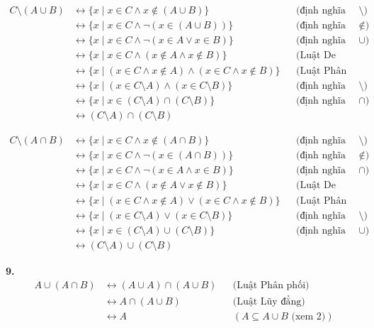 \documentclass[12pt,a4paper]{article}
\theoremstyle{definition}
\begin{document}
\begin{align*}
C \setminus (A \cup B) &\leftrightarrow \{x \mid x \in C \land x \notin (A \cup B)\} && \text{(định nghĩa của $\setminus$)}\\
&\leftrightarrow \{x \mid x \in C \land \neg(x \in (A \cup B))\} && \text{(định nghĩa của $\notin$)}\\
&\leftrightarrow \{x \mid x \in C \land \neg(x \in A \lor x \in B)\} && \text{(định nghĩa của $\cup$)}\\
&\leftrightarrow \{x \mid x \in C \land (x \notin A \land x \notin B)\} && \text{(Luật De Morgan)}\\
&\leftrightarrow \{x \mid (x \in C \land x \notin A) \land (x \in C \land x \notin B)\} && \text{(Luật Phân phối)}\\
&\leftrightarrow \{x \mid (x \in C \setminus A) \land (x \in C \setminus B)\} && \text{(định nghĩa của $\setminus$)}\\
&\leftrightarrow \{x \mid x \in (C \setminus A) \cap (C \setminus B)\} && \text{(định nghĩa của $\cap$)}\\
&\leftrightarrow (C \setminus A) \cap (C \setminus B)
\end{align*}

\begin{align*}
C \setminus (A \cap B) &\leftrightarrow \{x \mid x \in C \land x \notin (A \cap B)\} && \text{(định nghĩa của $\setminus$)}\\
&\leftrightarrow \{x \mid x \in C \land \neg(x \in (A \cap B))\} && \text{(định nghĩa của $\notin$)}\\
&\leftrightarrow \{x \mid x \in C \land \neg(x \in A \land x \in B)\} && \text{(định nghĩa của $\cap$)}\\
&\leftrightarrow \{x \mid x \in C \land (x \notin A \lor x \notin B)\} && \text{(Luật De Morgan)}\\
&\leftrightarrow \{x \mid (x \in C \land x \notin A) \lor (x \in C \land x \notin B)\} && \text{(Luật Phân phối)}\\
&\leftrightarrow \{x \mid (x \in C \setminus A) \lor (x \in C \setminus B)\} && \text{(định nghĩa của $\setminus$)}\\
&\leftrightarrow \{x \mid x \in (C \setminus A) \cup (C \setminus B)\} && \text{(định nghĩa của $\cup$)}\\
&\leftrightarrow (C \setminus A) \cup (C \setminus B)
\end{align*}

\bigskip
\textbf{9.}
\begin{align*}
A \cup (A \cap B) &\leftrightarrow (A \cup A) \cap (A \cup B) && \text{(Luật Phân phối)}\\
&\leftrightarrow A \cap (A \cup B) && \text{(Luật Lũy đẳng)}\\
&\leftrightarrow A && (A \subseteq A \cup B \text{ (xem 2)})
\end{align*}
\end{document}
